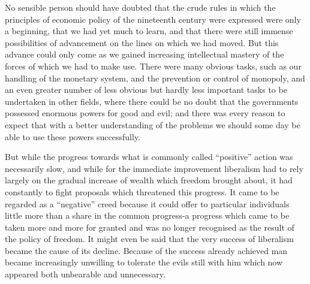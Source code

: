 \documentclass[11pt,openany]{book}
\begin{document}
No sensible person should have doubted that the crude rules in which the principles of economic policy of the nineteenth century were expressed were only a beginning, that we had yet much to learn, and that there were still immense possibilities of advancement on the lines on which we had moved. But this advance could only come as we gained increasing intellectual mastery of the forces of which we had to make use. There were many obvious tasks, such as our handling of the monetary system, and the prevention or control of monopoly, and an even greater number of less obvious but hardly less important tasks to be undertaken in other fields, where there could be no doubt that the governments possessed enormous powers for good and evil; and there was every reason to expect that with a better understanding of the problems we should some day be able to use these powers successfully.

But while the progress towards what is commonly called ``positive'' action was necessarily slow, and while for the immediate improvement liberalism had to rely largely on the gradual increase of wealth which freedom brought about, it had constantly to fight proposals which threatened this progress. It came to be regarded as a ``negative'' creed because it could offer to particular individuals little more than a share in the common progress-a progress which came to be taken more and more for granted and was no longer recognised as the result of the policy of freedom. It might even be said that the very success of liberalism became the cause of its decline. Because of the success already achieved man became increasingly unwilling to tolerate the evils still with him which now appeared both unbearable and unnecessary.

\begin{center}\textasteriskcentered\hspace{0.9em}\textasteriskcentered\hspace{0.9em}\textasteriskcentered\end{center}

\begin{center}\textasteriskcentered\hspace{0.9em}\textasteriskcentered\hspace{0.9em}\textasteriskcentered\end{center}

\begin{center}\textasteriskcentered\hspace{0.9em}\textasteriskcentered\hspace{0.9em}\textasteriskcentered\end{center}
\end{document}
